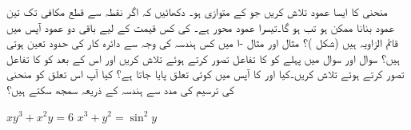 منحنی  کا ایسا عمود تلاش کریں جو  کے متوازی ہو۔
دکھائیں کہ اگر نقطہ  سے  قطع مکافی  تک تین عمود بنانا ممکن ہو تب  ہو گا۔تیسرا عمود محور  ہے۔ کی کس قیمت کے لیے باقی دو عمود آپس میں قائم الزاویہ ہیں (شکل )؟
مثال  اور مثال -ا میں کس ہندسہ کی وجہ سے دائرہ کار کی  حدود تعین ہوتی ہیں؟
سوال  اور سوال  میں پہلے  کو  کا تفاعل تصور کرتے ہوئے  تلاش کریں اور اس کے بعد  کو  کا تفاعل تصور کرتے ہوئے  تلاش کریں۔کیا  اور  کا آپس میں کوئی تعلق پایا جاتا ہے؟ کیا آپ اس تعلق کو منحنی کی ترسیم کی مدد سے ہندسہ کے ذریعہ سمجھ  سکتے ہیں؟

$xy^3+x^2y=6$ 
$x^3+y^2=\sin^2 y$

